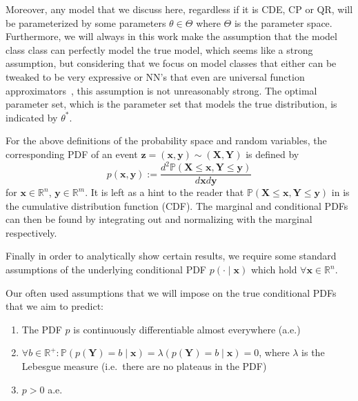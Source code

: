 Moreover, any model that we discuss here, regardless if it is CDE, CP or QR, will be parameterized by some parameters $\theta \in \Theta$ where $\Theta$ is the parameter space. Furthermore, we will always in this work make the assumption that the model class class can perfectly model the true model, which seems like a strong assumption, but considering that we focus on model classes that either can be tweaked to be very expressive or NN's that even are universal function approximators~\cite{HORNIK1989359}, this assumption is not unreasonably strong. The optimal parameter set, which is the parameter set that models the true distribution, is indicated by $\theta^*$.

For the above definitions of the probability space and random variables, the corresponding PDF of an event $\mathbf{z} = (\mathbf{x}, \mathbf{y}) \sim (\mathbf{X}, \mathbf{Y})$ is defined by
\begin{equation}\label{eq:pdf}
    p(\mathbf{x}, \mathbf{y}):=\frac{d^2 \mathbb{P}(\mathbf{X} \leq
        \mathbf{x}, \mathbf{Y} \leq \mathbf{y})}{d \mathbf{x} d \mathbf{y}}
\end{equation}
for $\mathbf{x} \in \mathbb{R}^n$, $\mathbf{y}\in\mathbb{R}^m$. It is left as a hint to the reader that $\mathbb{P}(\mathbf{X} \leq
    \mathbf{x}, \mathbf{Y} \leq \mathbf{y})$ in  is the cumulative distribution function (CDF). The marginal and conditional PDFs can then be found by integrating out and normalizing with the marginal respectively.

Finally in order to analytically show certain results, we require some standard assumptions of the underlying conditional PDF $p(\cdot\mid \mathbf{x})$ which hold $\forall \mathbf{x}\in \mathbb{R}^n$.

\begin{definition}\label{def:assumptions} 
    Our often used assumptions that we will impose on the true conditional PDFs that we aim to predict:
    \begin{enumerate}

        \item The PDF $p$ is continuously differentiable almost everywhere (a.e.)
        \item $\forall b\in\mathbb{R}^+: \mathbb{P}(p(\mathbf{Y}) = b\mid \mathbf{x}) = \lambda(p(\mathbf{Y}) = b \mid \mathbf{x}) = 0$, where $\lambda$ is the Lebesgue measure (i.e.\ there are no plateaus in the PDF)
        \item $p > 0$ a.e.
    \end{enumerate}
\end{definition}

